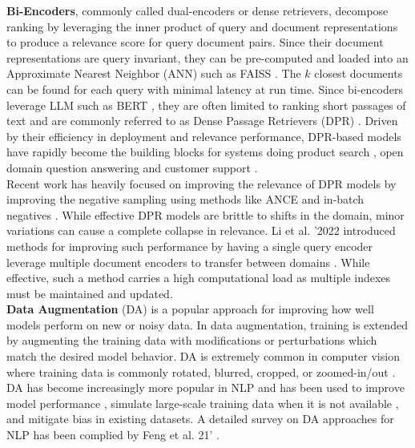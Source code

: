 \textbf{Bi-Encoders}, commonly called dual-encoders or dense retrievers, decompose ranking by leveraging the inner product of query and document representations to produce a relevance score for query document pairs. Since their document representations are query invariant, they can be pre-computed and loaded into an Approximate Nearest Neighbor (ANN) such as FAISS \cite{johnson2019billion}. The $k$ closest documents can be found for each query with minimal latency at run time. Since bi-encoders leverage LLM such as BERT \cite{Devlin2019BERTPO}, they are often limited to ranking short passages of text and are commonly referred to as Dense Passage Retrievers (DPR) \cite{Karpukhin2020DensePR}. Driven by their efficiency in deployment and relevance performance, DPR-based models have rapidly become the building blocks for systems doing product search \cite{Magnani2022SemanticRA}, open domain question answering \cite{Karpukhin2020DensePR} and customer support \cite{Mesquita2022DenseTR}.\\
Recent work has heavily focused on improving the relevance of DPR models by improving the negative sampling using methods like ANCE \cite{Xiong2021ApproximateNN} and in-batch negatives \cite{Lin2021InBatchNF}. While effective DPR models are brittle to shifts in the domain, minor variations can cause a complete collapse in relevance. Li et al. '2022 introduced methods for improving such performance by having a single query encoder leverage multiple document encoders to transfer between domains \cite{Li2022AnEA}. While effective, such a method carries a high computational load as multiple indexes must be maintained and updated. \\
\textbf{Data Augmentation} (DA) is a popular approach for improving how well models perform on new or noisy data. In data augmentation, training is extended by augmenting the training data with modifications or perturbations which match the desired model behavior. DA is extremely common in computer vision where training data is commonly rotated, blurred, cropped, or zoomed-in/out \cite{Mikoajczyk2018DataAF} \cite{Zhong2020RandomED}. \\
DA has become increasingly more popular in NLP and has been used to improve model performance \cite{Jiao2020TinyBERTDB}, simulate large-scale training data when it is not available \cite{Li2020ADD}, and mitigate bias \cite{Lu2020GenderBI} in existing datasets. A detailed survey on DA approaches for NLP has been complied by Feng et al. 21' \cite{Feng2021ASO}.\\
